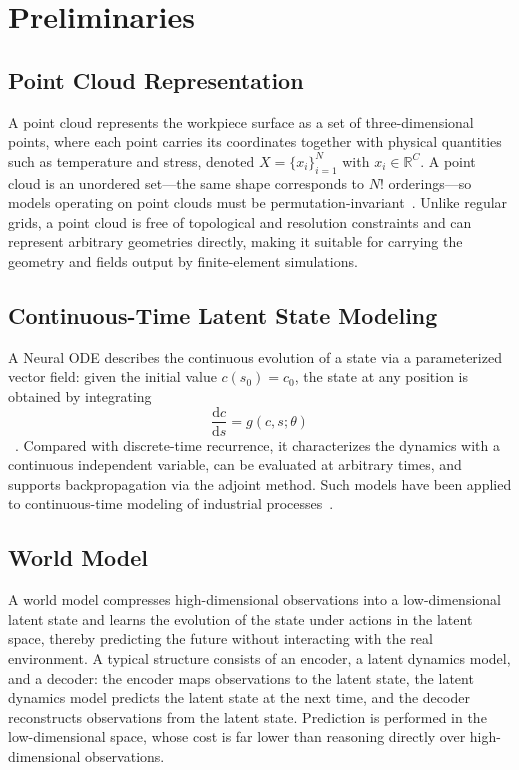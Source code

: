\section{Preliminaries}

\subsection{Point Cloud Representation}
A point cloud represents the workpiece surface as a set of three-dimensional points, where each point carries its coordinates together with physical quantities such as temperature and stress, denoted $X=\{x_i\}_{i=1}^{N}$ with $x_i\in\mathbb{R}^{C}$. A point cloud is an unordered set---the same shape corresponds to $N!$ orderings---so models operating on point clouds must be permutation-invariant~\cite{qi2017pointnet}. Unlike regular grids, a point cloud is free of topological and resolution constraints and can represent arbitrary geometries directly, making it suitable for carrying the geometry and fields output by finite-element simulations.

\subsection{Continuous-Time Latent State Modeling}
A Neural ODE describes the continuous evolution of a state via a parameterized vector field: given the initial value $c(s_0)=c_0$, the state at any position is obtained by integrating
\begin{equation}
\frac{\mathrm{d}c}{\mathrm{d}s}=g(c,s;\theta)
\end{equation}
~\cite{chen2018neural}. Compared with discrete-time recurrence, it characterizes the dynamics with a continuous independent variable, can be evaluated at arbitrary times, and supports backpropagation via the adjoint method. Such models have been applied to continuous-time modeling of industrial processes~\cite{yuan2022autonomous, yuan2023ode, yuan2022differential}.

\subsection{World Model}
A world model compresses high-dimensional observations into a low-dimensional latent state and learns the evolution of the state under actions in the latent space, thereby predicting the future without interacting with the real environment. A typical structure consists of an encoder, a latent dynamics model, and a decoder: the encoder maps observations to the latent state, the latent dynamics model predicts the latent state at the next time, and the decoder reconstructs observations from the latent state. Prediction is performed in the low-dimensional space, whose cost is far lower than reasoning directly over high-dimensional observations.

